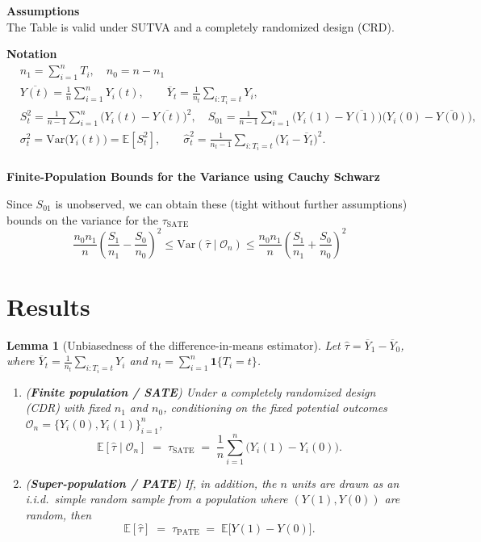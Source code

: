 \documentclass[11pt]{exam}
\theoremstyle{plain}
\newtheorem{lemma}{Lemma}
\newcommand{\E}{\mathbb{E}}
\newcommand{\Var}{\mathrm{Var}}
\begin{document}
\begin{table}[h!]
\vspace{0.5em}
\noindent\small\textbf{Assumptions}
\\
The Table is valid under SUTVA and a completely randomized design (CRD).

\noindent\small\textbf{Notation}
\[
\begin{aligned}
&n_1=\sum_{i=1}^n T_i,\quad n_0=n-n_1\\
&\overline{Y(t)} =\frac{1}{n}\sum_{i=1}^n Y_i(t), \qquad \overline Y_t=\frac{1}{n_t}\sum_{i:T_i=t}Y_i, \\
&S_t^2=\frac{1}{n-1}\sum_{i=1}^n\big(Y_i(t)-\overline{Y(t)}\big)^2,\quad 
S_{01}=\frac{1}{n-1}\sum_{i=1}^n\!\big(Y_i(1)-\overline{Y(1)}\big)\big(Y_i(0)-\overline{Y(0)}\big),\\
&\sigma_t^2=\Var\!\big(Y_i(t)\big) = \E[S_t^2],\qquad \hat\sigma_t^2=\frac{1}{n_t-1}\sum_{i:T_i=t}\big(Y_i-\overline Y_t\big)^2.\\
\end{aligned}
\]

\noindent\small\textbf{Finite-Population Bounds for the Variance using Cauchy Schwarz}

Since $S_{01}$ is unobserved, we can obtain these (tight without further assumptions) bounds on the variance for the $\tau_{\mathrm{SATE}}$
\[
\displaystyle \frac{n_0n_1}{n}\!\left(\frac{S_1}{n_1}-\frac{S_0}{n_0}\right)^{\!2}
\le \Var(\hat\tau\mid \mathcal O_n) \le
\frac{n_0n_1}{n}\!\left(\frac{S_1}{n_1}+\frac{S_0}{n_0}\right)^{\!2}
\]
\end{table}

\newpage
\section{Results}
\begin{lemma}[Unbiasedness of the difference-in-means estimator]
\label{lem:unbiasedness}
Let $\hat\tau=\overline Y_1-\overline Y_0$, where $\overline Y_t=\frac{1}{n_t}\sum_{i:T_i=t}Y_i$ and $n_t=\sum_{i=1}^n\mathbf 1\{T_i=t\}$.
\begin{enumerate}[label=(\roman*)]
    \item (\textbf{Finite population / SATE}) Under a completely randomized design (CDR) with fixed $n_1$ and $n_0$, conditioning on the fixed potential outcomes $\mathcal O_n=\{Y_i(0),Y_i(1)\}_{i=1}^n$,
    \[
    \mathbb{E}\!\left[\hat\tau\mid \mathcal O_n\right] \;=\; \tau_{\mathrm{SATE}}
    \;=\; \frac{1}{n}\sum_{i=1}^n\big(Y_i(1)-Y_i(0)\big).
    \]
    \item (\textbf{Super-population / PATE}) If, in addition, the $n$ units are drawn as an i.i.d.\ simple random sample from a population where $(Y(1),Y(0))$ are random, then
    \[
    \mathbb{E}\!\left[\hat\tau\right] \;=\; \tau_{\mathrm{PATE}}
    \;=\; \mathbb{E}\!\big[Y(1)-Y(0)\big].
    \]
\end{enumerate}
\end{lemma}
\end{document}
